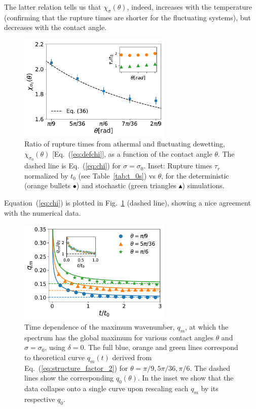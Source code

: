 The latter relation tells us that $\chi_{\sigma}(\theta)$, indeed, increases with the temperature (confirming that the rupture times are shorter for the fluctuating systems), but decreases with the contact angle.
\begin{figure}
    \centering
    \includegraphics[width=0.65\textwidth]{graphics/Andrea_model_t0_normed_rupture_times.pdf}
    \caption{Ratio of rupture times from athermal and fluctuating dewetting, $\chi_{\sigma_0}(\theta)$ [Eq.~(\ref{eq:defchi}], as a function of the contact angle $\theta$. 
    The dashed line is Eq.~(\ref{eq:chi}) for $\sigma=\sigma_0$.
    Inset: Rupture times $\tau_r$ normalized by $t_0$ (see Table~\ref{tab:t_0s}) vs $\theta$, for the deterministic (orange bullets \textcolor{pyorange}{$\bullet$}) and stochastic (green triangles \textcolor{pygreen}{$\blacktriangle$}) simulations.
    }
    \label{fig:rupture_times_semilogy_more_theta}
\end{figure}
Equation~(\ref{eq:chi}) is plotted in Fig.~\ref{fig:rupture_times_semilogy_more_theta} (dashed line), showing a nice agreement with the numerical data.
\begin{figure}
    \centering
    \includegraphics[width=0.65\textwidth]{graphics/evolution_qm_with_inset_slip0.pdf}
    \caption{Time dependence of the maximum wavenumber, $q_m$, at which the spectrum has the global maximum for various contact angles $\theta$ and $\sigma = \sigma_0$, using $\delta=0$.
    The full blue, orange and green lines correspond to theoretical curve $q_m(t)$ derived from Eq.~(\ref{eq:structure_factor_2}) for $\theta = \pi/9, 5\pi/36, \pi/6$.
    The dashed lines show the corresponding $q_0(\theta)$. 
    In the inset we show that the data collapse onto a single curve upon rescaling each $q_m$ by its respective $q_0$.}
    \label{fig:evolution_spectrum_peak_with_t}
\end{figure}


